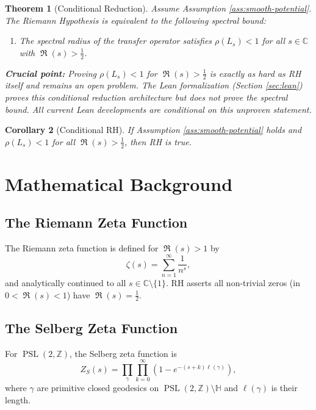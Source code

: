 \documentclass[11pt,a4paper]{article}
\newtheorem{theorem}{Theorem}[section]
\newtheorem{corollary}[theorem]{Corollary}
\theoremstyle{definition}
\DeclareMathOperator{\PSL}{PSL}
\DeclareMathOperator{\Ree}{\Re}
\newcommand{\Z}{\mathbb{Z}}
\newcommand{\C}{\mathbb{C}}
\newcommand{\PSLtwoZ}{\PSL(2,\Z)}
\newcommand{\half}{\frac{1}{2}}
\newcommand{\Zeta}{\zeta}
\begin{document}
\begin{theorem}[Conditional Reduction]
\label{thm:conditional}
Assume Assumption \ref{ass:smooth-potential}. The Riemann Hypothesis is {\em equivalent} to the following spectral bound:
\begin{enumerate}
\item The spectral radius of the transfer operator satisfies $\rho(L_s) < 1$ for all $s \in \C$ with $\Ree(s) > \half$.
\end{enumerate}
\noindent\textbf{Crucial point:} Proving $\rho(L_s) < 1$ for $\Ree(s) > \half$ is {\em exactly as hard as RH itself} and remains an {\em open problem}. The Lean formalization (Section \ref{sec:lean}) proves this conditional reduction architecture but does {\em not} prove the spectral bound. All current Lean developments are conditional on this unproven statement.
\end{theorem}
\n\begin{corollary}[Conditional RH]
If Assumption \ref{ass:smooth-potential} holds {\em and} $\rho(L_s) < 1$ for all $\Ree(s) > \half$, then RH is true.
\end{corollary}

\section{Mathematical Background}
\label{sec:background}

\subsection{The Riemann Zeta Function}
\label{sec:zeta}

The Riemann zeta function is defined for $\Ree(s) > 1$ by
\begin{equation*}
\Zeta(s) = \sum_{n=1}^{\infty} \frac{1}{n^s},
\end{equation*}
and analytically continued to all $s \in \C \setminus \{1\}$. RH asserts all non-trivial zeros (in $0 < \Ree(s) < 1$) have $\Ree(s) = \half$.

\subsection{The Selberg Zeta Function}
\label{sec:selberg}

For $\PSLtwoZ$, the Selberg zeta function is
\begin{equation*}
Z_S(s) = \prod_{\gamma} \prod_{k=0}^{\infty} \left(1 - e^{-(s+k)\ell(\gamma)}\right),
\end{equation*}
where $\gamma$ are primitive closed geodesics on $\PSLtwoZ \setminus \mathbb{H}$ and $\ell(\gamma)$ is their length.
\end{document}
